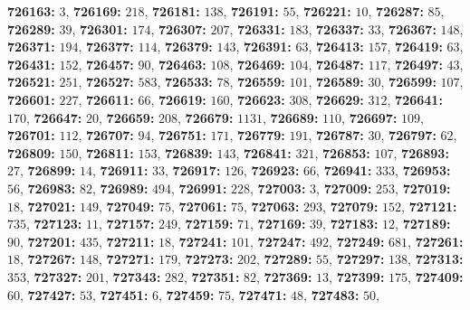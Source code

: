 \textsf{\bfseries 726163:} $3$, \textsf{\bfseries 726169:} $218$, \textsf{\bfseries 726181:} $138$, \textsf{\bfseries 726191:} $55$, \textsf{\bfseries 726221:} $10$, \textsf{\bfseries 726287:} $85$, \textsf{\bfseries 726289:} $39$, \textsf{\bfseries 726301:} $174$, \textsf{\bfseries 726307:} $207$, \textsf{\bfseries 726331:} $183$, \textsf{\bfseries 726337:} $33$, \textsf{\bfseries 726367:} $148$, \textsf{\bfseries 726371:} $194$, \textsf{\bfseries 726377:} $114$, \textsf{\bfseries 726379:} $143$, \textsf{\bfseries 726391:} $63$, \textsf{\bfseries 726413:} $157$, \textsf{\bfseries 726419:} $63$, \textsf{\bfseries 726431:} $152$, \textsf{\bfseries 726457:} $90$, \textsf{\bfseries 726463:} $108$, \textsf{\bfseries 726469:} $104$, \textsf{\bfseries 726487:} $117$, \textsf{\bfseries 726497:} $43$, \textsf{\bfseries 726521:} $251$, \textsf{\bfseries 726527:} $583$, \textsf{\bfseries 726533:} $78$, \textsf{\bfseries 726559:} $101$, \textsf{\bfseries 726589:} $30$, \textsf{\bfseries 726599:} $107$, \textsf{\bfseries 726601:} $227$, \textsf{\bfseries 726611:} $66$, \textsf{\bfseries 726619:} $160$, \textsf{\bfseries 726623:} $308$, \textsf{\bfseries 726629:} $312$, \textsf{\bfseries 726641:} $170$, \textsf{\bfseries 726647:} $20$, \textsf{\bfseries 726659:} $208$, \textsf{\bfseries 726679:} $1131$, \textsf{\bfseries 726689:} $110$, \textsf{\bfseries 726697:} $109$, \textsf{\bfseries 726701:} $112$, \textsf{\bfseries 726707:} $94$, \textsf{\bfseries 726751:} $171$, \textsf{\bfseries 726779:} $191$, \textsf{\bfseries 726787:} $30$, \textsf{\bfseries 726797:} $62$, \textsf{\bfseries 726809:} $150$, \textsf{\bfseries 726811:} $153$, \textsf{\bfseries 726839:} $143$, \textsf{\bfseries 726841:} $321$, \textsf{\bfseries 726853:} $107$, \textsf{\bfseries 726893:} $27$, \textsf{\bfseries 726899:} $14$, \textsf{\bfseries 726911:} $33$, \textsf{\bfseries 726917:} $126$, \textsf{\bfseries 726923:} $66$, \textsf{\bfseries 726941:} $333$, \textsf{\bfseries 726953:} $56$, \textsf{\bfseries 726983:} $82$, \textsf{\bfseries 726989:} $494$, \textsf{\bfseries 726991:} $228$, \textsf{\bfseries 727003:} $3$, \textsf{\bfseries 727009:} $253$, \textsf{\bfseries 727019:} $18$, \textsf{\bfseries 727021:} $149$, \textsf{\bfseries 727049:} $75$, \textsf{\bfseries 727061:} $75$, \textsf{\bfseries 727063:} $293$, \textsf{\bfseries 727079:} $152$, \textsf{\bfseries 727121:} $735$, \textsf{\bfseries 727123:} $11$, \textsf{\bfseries 727157:} $249$, \textsf{\bfseries 727159:} $71$, \textsf{\bfseries 727169:} $39$, \textsf{\bfseries 727183:} $12$, \textsf{\bfseries 727189:} $90$, \textsf{\bfseries 727201:} $435$, \textsf{\bfseries 727211:} $18$, \textsf{\bfseries 727241:} $101$, \textsf{\bfseries 727247:} $492$, \textsf{\bfseries 727249:} $681$, \textsf{\bfseries 727261:} $18$, \textsf{\bfseries 727267:} $148$, \textsf{\bfseries 727271:} $179$, \textsf{\bfseries 727273:} $202$, \textsf{\bfseries 727289:} $55$, \textsf{\bfseries 727297:} $138$, \textsf{\bfseries 727313:} $353$, \textsf{\bfseries 727327:} $201$, \textsf{\bfseries 727343:} $282$, \textsf{\bfseries 727351:} $82$, \textsf{\bfseries 727369:} $13$, \textsf{\bfseries 727399:} $175$, \textsf{\bfseries 727409:} $60$, \textsf{\bfseries 727427:} $53$, \textsf{\bfseries 727451:} $6$, \textsf{\bfseries 727459:} $75$, \textsf{\bfseries 727471:} $48$, \textsf{\bfseries 727483:} $50$, 
